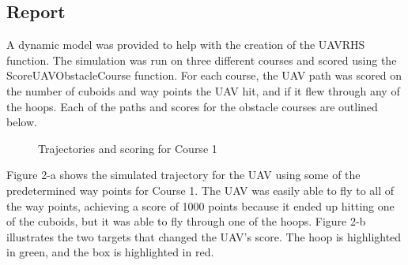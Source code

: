 \documentclass[12pt]{article}
\begin{document}
\subsection*{\centering Report} 
A dynamic model was provided to help with the creation of the UAVRHS function. 
The simulation was run on three different courses and scored using the ScoreUAVObstacleCourse function. For each course, the UAV path was scored on the number of cuboids and way points the UAV hit, and if it flew through any of the hoops. Each of the paths and scores for the obstacle courses are outlined below. 
\begin{figure}[H]
	\caption{Trajectories and scoring for Course 1}
\end{figure}
Figure 2-a shows the simulated trajectory for the UAV using some of the predetermined way points for Course 1. The UAV was easily able to fly to all of the way points, achieving a score of 1000 points because it ended up hitting one of the cuboids, but it was able to fly through one of the hoops. Figure 2-b illustrates the two targets that changed the UAV's score. The hoop is highlighted in green, and the box is highlighted in red. 
\end{document}
